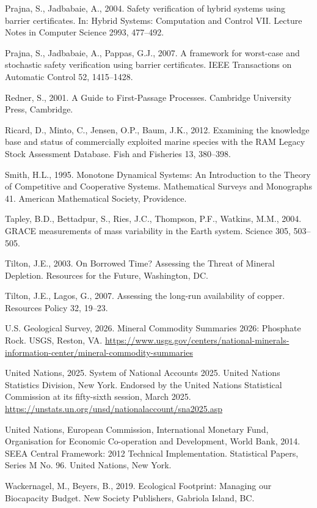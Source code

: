 \documentclass[11pt]{article}
\begin{document}
Prajna, S., Jadbabaie, A., 2004. Safety verification of hybrid systems using barrier certificates. In: Hybrid Systems: Computation and Control VII. Lecture Notes in Computer Science 2993, 477--492.

Prajna, S., Jadbabaie, A., Pappas, G.J., 2007. A framework for worst-case and stochastic safety verification using barrier certificates. IEEE Transactions on Automatic Control 52, 1415--1428.

Redner, S., 2001. A Guide to First-Passage Processes. Cambridge University Press, Cambridge.

Ricard, D., Minto, C., Jensen, O.P., Baum, J.K., 2012. Examining the knowledge base and status of commercially exploited marine species with the RAM Legacy Stock Assessment Database. Fish and Fisheries 13, 380--398.

Smith, H.L., 1995. Monotone Dynamical Systems: An Introduction to the Theory of Competitive and Cooperative Systems. Mathematical Surveys and Monographs 41. American Mathematical Society, Providence.

Tapley, B.D., Bettadpur, S., Ries, J.C., Thompson, P.F., Watkins, M.M., 2004. GRACE measurements of mass variability in the Earth system. Science 305, 503--505.

Tilton, J.E., 2003. On Borrowed Time? Assessing the Threat of Mineral Depletion. Resources for the Future, Washington, DC.

Tilton, J.E., Lagos, G., 2007. Assessing the long-run availability of copper. Resources Policy 32, 19--23.

U.S. Geological Survey, 2026. Mineral Commodity Summaries 2026: Phosphate Rock. USGS, Reston, VA. \url{https://www.usgs.gov/centers/national-minerals-information-center/mineral-commodity-summaries}

United Nations, 2025. System of National Accounts 2025. United Nations Statistics Division, New York. Endorsed by the United Nations Statistical Commission at its fifty-sixth session, March 2025. \url{https://unstats.un.org/unsd/nationalaccount/sna2025.asp}

United Nations, European Commission, International Monetary Fund, Organisation for Economic Co-operation and Development, World Bank, 2014. SEEA Central Framework: 2012 Technical Implementation. Statistical Papers, Series M No. 96. United Nations, New York.

Wackernagel, M., Beyers, B., 2019. Ecological Footprint: Managing our Biocapacity Budget. New Society Publishers, Gabriola Island, BC.
\end{document}
